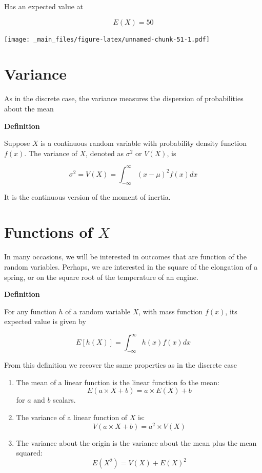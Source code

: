 \documentclass[
]{book}
\begin{document}
Has an expected value at

\[E(X)=50\]

\texttt{[image: \_main\_files/figure-latex/unnamed-chunk-51-1.pdf]}

\hypertarget{variance-1}{%
\section{Variance}\label{variance-1}}

As in the discrete case, the variance measures the dispersion of probabilities about the mean

\textbf{Definition}

Suppose \(X\) is a continuous random variable with probability density function \(f(x)\). The variance of \(X\), denoted as \(\sigma^2\) or \(V(X)\), is

\[\sigma^2=V(X)=\int_{-\infty}^\infty (x-\mu)^2 f(x) dx\]

It is the continuous version of the moment of inertia.

\hypertarget{functions-of-x}{%
\section{\texorpdfstring{Functions of \(X\)}{Functions of X}}\label{functions-of-x}}

In many occasions, we will be interested in outcomes that are function of the random variables. Perhaps, we are interested in the square of the elongation of a spring, or on the square root of the temperature of an engine.

\textbf{Definition}

For any function \(h\) of a random variable \(X\), with mass function \(f(x)\), its expected value is given by

\[E[h(X)]= \int_{-\infty}^{\infty} h(x) f(x)dx\]

From this definition we recover the same properties as in the discrete case

\begin{enumerate}
\def\labelenumi{\arabic{enumi})}
\item
  The mean of a linear function is the linear function fo the mean: \[E(a\times X +b)= a\times E(X) +b\] for \(a\) and \(b\) scalars.
\item
  The variance of a linear function of \(X\) is:\[V(a\times X +b)= a^2\times V(X)\]
\item
  The variance about the origin is the variance about the mean plus the mean squared: \[E(X^2)=V(X)+E(X)^2\]
\end{enumerate}
\end{document}
